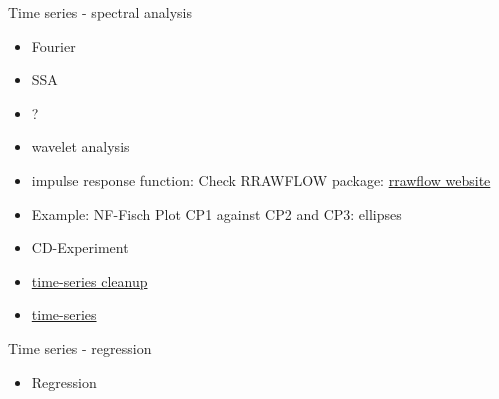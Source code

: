 \documentclass[8pt,ignorenonframetext,]{beamer}
\providecommand{\tightlist}{%
  \setlength{\itemsep}{0pt}\setlength{\parskip}{0pt}}
\begin{document}
\begin{frame}{Time series - spectral analysis}

\begin{itemize}
\item
  Fourier
\item
  SSA
\item
  ?
\item
  wavelet analysis
\item
  impulse response function: Check RRAWFLOW package:
  \href{https://sd.water.usgs.gov/projects/RRAWFLOW/RRAWFLOW.html}{rrawflow
  website}
\item
  Example: NF-Fisch Plot CP1 against CP2 and CP3: ellipses
\item
  CD-Experiment
\item
  \href{https://cran.r-project.org/web/packages/waterData/vignettes/vignette.pdf}{time-series
  cleanup}
\item
  \href{http://www.css.cornell.edu/faculty/dgr2/teach/R/R_ts.pdf}{time-series}
\end{itemize}

\end{frame}

\begin{frame}{Time series - regression}

\begin{itemize}
\tightlist
\item
  Regression
\end{itemize}

\end{frame}
\end{document}
